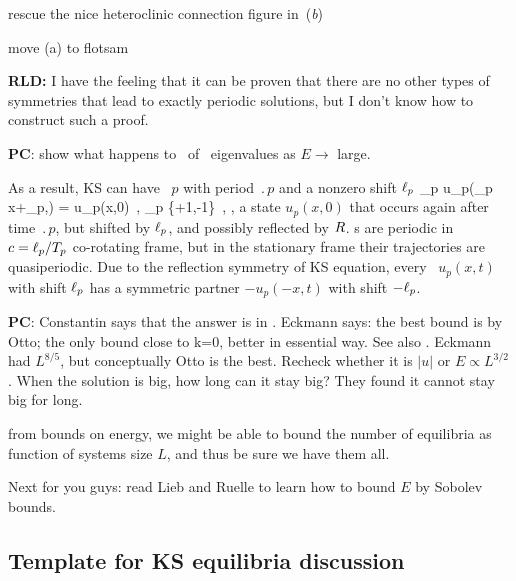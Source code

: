 rescue the nice heteroclinic connection figure
    in \,(\textit{b})

     move (a) to flotsam

{\bf RLD:} I have the feeling that it can be proven that there are
no other types of symmetries that lead to exactly periodic
solutions, but I don't know how to construct such a proof.

{\bf PC}: show what happens to \eqva\ of \eqva\ eigenvalues
as $E \to $ large.

\bigskip

As a result, KS can have
\rpo\ $p$ with period $\period{p}$ and
a nonzero shift $\ell_p$
\beq
\sigma_p u_p(\sigma_p x+\shift_p,) = u_p(x,0)
\,,\qquad
\sigma_p \in \{+1,-1\}
\,,
\ie, a state $u_p(x,0)$ that occurs again after time $\period{p}$,
but shifted by $\ell_p$, and possibly reflected by $R$.
{\Rpo s} are periodic in $c=\ell_p/{T_{p}}$
co-rotating frame,
but in the stationary frame their trajectories
are quasiperiodic.
Due to the reflection symmetry  of KS equation,
every \rpo\
$u_p(x,t)$ with shift $\ell_p$ has a symmetric partner
$-u_p(-x,t)$ with shift $-\ell_p$.

%
{\bf PC}:
  Constantin says that the answer is in
    . Eckmann says: the  best bound is by Otto; the
    only bound close to k=0, better in essential way. See also \refref{bronski-2005}.
    Eckmann had $L^{8/5}$, but conceptually Otto is the best. Recheck whether it is
    $|u|$ or $E \propto L^{3/2}$.
    When the solution is big, how long can it stay big? They found it cannot stay big for
    long.


from bounds on energy, we might be able
to bound the number of equilibria as function of systems size $L$, and thus
be sure we have them all.

Next for you guys: read Lieb and Ruelle to learn
    how to bound $E$  by Sobolev bounds.

\subsection{Template for KS equilibria discussion}

